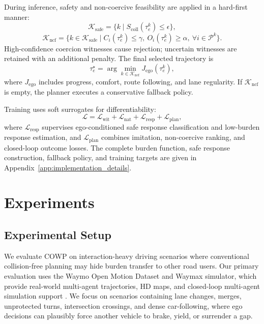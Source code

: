 \documentclass[10pt]{article}
\begin{document}
During inference, safety and non-coercive feasibility are applied in a hard-first manner:
\begin{equation}
    \mathcal{K}_{\mathrm{safe}}
    =
    \{k \mid S_{\mathrm{coll}}(\tau^k_e)\le \epsilon \},
\end{equation}
\begin{equation}
    \mathcal{K}_{\mathrm{ncf}}
    =
    \{k\in\mathcal{K}_{\mathrm{safe}}
    \mid
    C_i(\tau^k_e)\le \gamma,\ 
    O_i(\tau^k_e)\ge \alpha,\ 
    \forall i\in\mathcal{P}^k
    \}.
\end{equation}
High-confidence coercion witnesses cause rejection; uncertain witnesses are retained with an additional penalty. The final selected trajectory is
\begin{equation}
    \tau^\star_e
    =
    \arg\min_{k\in\mathcal{K}_{\mathrm{ncf}}}
    J_{\mathrm{ego}}(\tau^k_e),
\end{equation}
where $J_{\mathrm{ego}}$ includes progress, comfort, route following, and lane regularity. If $\mathcal{K}_{\mathrm{ncf}}$ is empty, the planner executes a conservative fallback policy.

Training uses soft surrogates for differentiability:
\begin{equation}
    \mathcal{L}
    =
    \mathcal{L}_{\mathrm{wit}}
    +
    \mathcal{L}_{\mathrm{nat}}
    +
    \mathcal{L}_{\mathrm{resp}}
    +
    \mathcal{L}_{\mathrm{plan}},
\end{equation}
where $\mathcal{L}_{\mathrm{resp}}$ supervises ego-conditioned safe response classification and low-burden response estimation, and $\mathcal{L}_{\mathrm{plan}}$ combines imitation, non-coercive ranking, and closed-loop outcome losses. The complete burden function, safe response construction, fallback policy, and training targets are given in Appendix~\ref{app:implementation_details}.



\section{Experiments}
\label{sec:experiments}

\subsection{Experimental Setup}
\label{sec:exp_setup}

We evaluate COWP on interaction-heavy driving scenarios where conventional collision-free planning may hide burden transfer to other road users. Our primary evaluation uses the Waymo Open Motion Dataset and Waymax simulator, which provide real-world multi-agent trajectories, HD maps, and closed-loop multi-agent simulation support \cite{ettinger2021large, gulino2023waymax}. We focus on scenarios containing lane changes, merges, unprotected turns, intersection crossings, and dense car-following, where ego decisions can plausibly force another vehicle to brake, yield, or surrender a gap.
\end{document}
